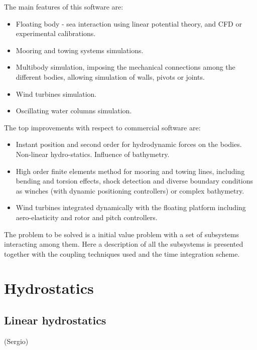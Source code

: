 \documentclass[10pt] {article}
\begin{document}
The main features of this software are:

\begin{itemize}
    \item Floating body - sea interaction using linear potential theory, and CFD or experimental calibrations.
    \item Mooring and towing systems simulations.
    \item Multibody simulation, imposing the mechanical connections among the different bodies, allowing simulation of walls, pivots or joints.
    \item Wind turbines simulation. 
    \item Oscillating water columns simulation.
\end{itemize}

The top improvements with respect to commercial software are:

\begin{itemize}
    \item Instant position and second order for hydrodynamic forces on the bodies. Non-linear hydro-statics. Influence of bathymetry.
    \item High order finite elements method for mooring and towing lines, including bending and torsion effects, shock detection and diverse boundary conditions as winches (with dynamic positioning controllers) or complex bathymetry. 
    \item Wind turbines integrated dynamically with the floating platform including aero-elasticity and rotor and pitch controllers.
\end{itemize}

The problem to be solved is a initial value problem with a set of subsystems interacting among them. Here a description of all the subsystems is presented together with the coupling techniques used and the time integration scheme.

\clearpage


\section{Hydrostatics}

\subsection{Linear hydrostatics}
(Sergio)
\end{document}

